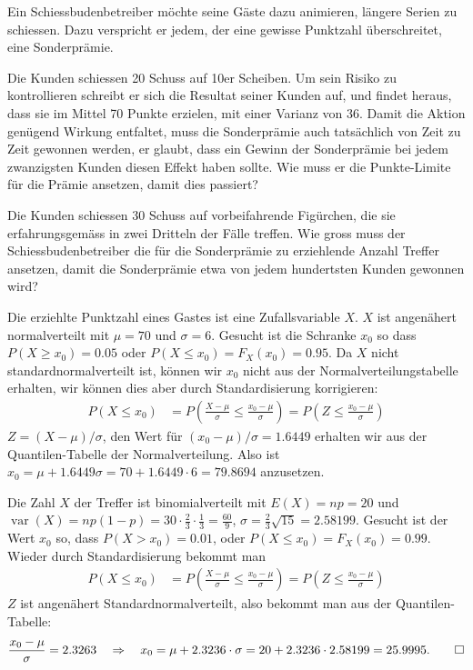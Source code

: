 Ein Schiessbudenbetreiber möchte seine Gäste dazu animieren,
längere Serien zu schiessen. Dazu verspricht er jedem, der eine
gewisse Punktzahl überschreitet, eine Sonderprämie.
\begin{teilaufgaben}
\item
Die Kunden schiessen 20 Schuss auf 10er Scheiben. Um sein Risiko
zu kontrollieren schreibt er sich die Resultat seiner Kunden auf,
und findet heraus, dass sie im Mittel 70 Punkte erzielen, mit einer
Varianz von 36. Damit die Aktion genügend Wirkung entfaltet,
muss die Sonderprämie auch tatsächlich von Zeit zu Zeit
gewonnen werden, er glaubt, dass ein Gewinn der Sonderprämie
bei jedem zwanzigsten Kunden diesen Effekt haben sollte. Wie
muss er die Punkte-Limite für die Prämie ansetzen, damit dies
passiert?
\item
Die Kunden schiessen 30 Schuss auf vorbeifahrende Figürchen, die
sie erfahrungsgemäss in zwei Dritteln der Fälle treffen. Wie
gross muss der Schiessbudenbetreiber die für die Sonderprämie
zu erziehlende Anzahl Treffer ansetzen, damit die Sonderprämie
etwa von jedem hundertsten Kunden gewonnen wird?
\end{teilaufgaben}

\begin{loesung}
\begin{teilaufgaben}
\item
Die erziehlte Punktzahl eines Gastes ist eine Zufallsvariable $X$.
$X$ ist angenähert normalverteilt mit $\mu=70$ und
$\sigma=6$. Gesucht ist die Schranke $x_0$ so dass
$P(X\ge x_0)=0.05$ oder $P(X\le x_0)=F_X(x_0)=0.95$.
Da $X$ nicht standardnormalverteilt ist, können wir $x_0$ nicht
aus der Normalverteilungstabelle erhalten, wir können dies aber
durch Standardisierung korrigieren:
\begin{align*}
P(X\le x_0)
&=
P\left(\frac{X-\mu}{\sigma}\le\frac{x_0-\mu}{\sigma}\right)
=
P\left(Z\le \frac{x_0-\mu}{\sigma}\right)
\end{align*}
$Z=(X-\mu)/\sigma$, den Wert für $(x_0-\mu)/\sigma=1.6449$ erhalten
wir aus der Quantilen-Tabelle der Normalverteilung. Also ist
$x_0=\mu +1.6449\sigma=70 + 1.6449\cdot 6=79.8694$ anzusetzen.
\item
Die Zahl $X$ der Treffer ist binomialverteilt mit $E(X) = np=20$ und
$\operatorname{var}(X)=np(1-p)=30\cdot\frac23\cdot\frac13=\frac{60}{9}$,
$\sigma = \frac23\sqrt{15}=2.58199$.
Gesucht ist der Wert $x_0$ so, dass $P(X>x_0)=0.01$, oder
$P(X\le x_0)=F_X(x_0)=0.99$. Wieder durch Standardisierung bekommt
man
\begin{align*}
P(X\le x_0)
&=
P\left(
\frac{X-\mu}{\sigma}\le\frac{x_0-\mu}{\sigma}
\right)
=
P\left(
Z\le \frac{x_0-\mu}{\sigma}
\right)
\end{align*}
$Z$ ist angenähert Standardnormalverteilt, also bekommt man aus
der Quantilen-Tabelle:
\[
\frac{x_0-\mu}{\sigma}=2.3263
\quad
\Rightarrow
\quad
x_0=\mu+2.3236\cdot \sigma=20 + 2.3236\cdot 2.58199 = 25.9995.
\qedhere
\]
\end{teilaufgaben}
\end{loesung}

